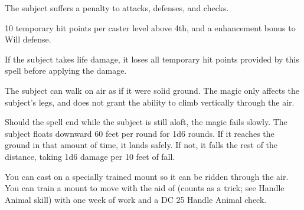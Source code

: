 \spellrng{\rngmed}
\spelldur{\durshort}
\begin{spelleffect}
  The subject suffers a  penalty to attacks, defenses, and checks.
\end{spelleffect}

\spellrng{\rngclose}
\spelldur{\durshort}
\begin{spellsuccess}
    10 temporary hit points  per caster level above 4th, and a  enhancement bonus to Will defense. \spellbonusscalingdescription
\end{spellsuccess}
\begin{spellnotes}
    If the subject takes life damage, it loses all temporary hit points provided by this spell before applying the damage.
\end{spellnotes}

\spellrng{\rngtouch}
\spelldur{\durshort}
\begin{spelleffect}
  The subject can walk on air as if it were solid ground. The magic only affects the subject's legs, and does not grant the ability to climb vertically through the air.
  \par Should the spell end while the subject is still aloft, the magic fails slowly. The subject floats downward 60 feet per round for 1d6 rounds. If it reaches the ground in that amount of time, it lands safely. If not, it falls the rest of the distance, taking 1d6 damage per 10 feet of fall.
\end{spelleffect}
\begin{spellnotes}
  \par You can cast  on a specially trained mount so it can be ridden through the air. You can train a mount to move with the aid of  (counts as a trick; see Handle Animal skill) with one week of work and a DC 25 Handle Animal check.
\end{spellnotes}

